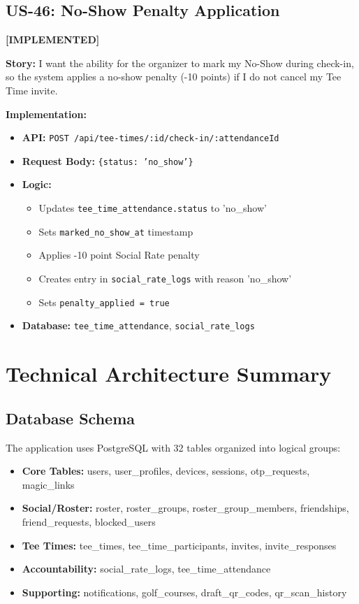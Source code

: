 \documentclass[11pt,a4paper]{article}
\newcommand{\implemented}{\textcolor{implemented}{\textbf{[IMPLEMENTED]}}}
\begin{document}
\subsection{US-46: No-Show Penalty Application}
\implemented

\textbf{Story:} I want the ability for the organizer to mark my No-Show during check-in, so the system applies a no-show penalty (-10 points) if I do not cancel my Tee Time invite.

\textbf{Implementation:}
\begin{itemize}[leftmargin=*]
  \item \textbf{API:} \texttt{POST /api/tee-times/:id/check-in/:attendanceId}
  \item \textbf{Request Body:} \texttt{\{status: 'no\_show'\}}
  \item \textbf{Logic:}
    \begin{itemize}
      \item Updates \texttt{tee\_time\_attendance.status} to 'no\_show'
      \item Sets \texttt{marked\_no\_show\_at} timestamp
      \item Applies -10 point Social Rate penalty
      \item Creates entry in \texttt{social\_rate\_logs} with reason 'no\_show'
      \item Sets \texttt{penalty\_applied = true}
    \end{itemize}
  \item \textbf{Database:} \texttt{tee\_time\_attendance}, \texttt{social\_rate\_logs}
\end{itemize}

\section{Technical Architecture Summary}

\subsection{Database Schema}

The application uses PostgreSQL with 32 tables organized into logical groups:

\begin{itemize}[leftmargin=*]
  \item \textbf{Core Tables:} users, user\_profiles, devices, sessions, otp\_requests, magic\_links
  \item \textbf{Social/Roster:} roster, roster\_groups, roster\_group\_members, friendships, friend\_requests, blocked\_users
  \item \textbf{Tee Times:} tee\_times, tee\_time\_participants, invites, invite\_responses
  \item \textbf{Accountability:} social\_rate\_logs, tee\_time\_attendance
  \item \textbf{Supporting:} notifications, golf\_courses, draft\_qr\_codes, qr\_scan\_history
\end{itemize}
\end{document}
